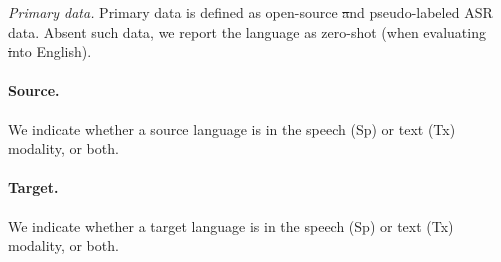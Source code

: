 \textit{Primary data.} Primary data is defined as open-source \st and pseudo-labeled ASR data. Absent such data, we report the language as zero-shot (when evaluating \st into English).

\paragraph{Source.}
We indicate whether a source language is in the speech (Sp) or text (Tx) modality, or both.

\paragraph{Target.}
We indicate whether a target language is in the speech (Sp) or text (Tx) modality, or both.



\restoregeometry

\FloatBarrier
